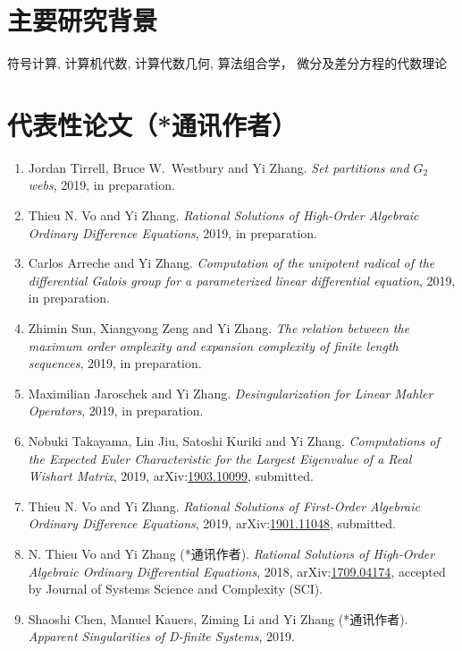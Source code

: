 \documentclass[a4paper,12pt]{article}
\begin{document}
\begin{CJK*}{UTF8}{gbsn}
\section*{\Large{主要研究背景}}
符号计算, 计算机代数, 计算代数几何, 算法组合学， 微分及差分方程的代数理论

\section*{\Large{代表性论文（*通讯作者）}}
\begin{enumerate}
\item Jordan Tirrell, Bruce W.\ Westbury and Yi Zhang. 
{\em Set partitions and $G_2$ webs}, 2019, in preparation.
\item Thieu N. Vo and Yi Zhang. 
{\em Rational Solutions of High-Order Algebraic Ordinary Difference Equations}, 2019, in preparation.
\item Carlos Arreche and Yi Zhang.
{\em Computation of the unipotent radical of the differential Galois group for a parameterized linear differential equation}, 2019, in preparation. 
\item Zhimin Sun,  Xiangyong Zeng and Yi Zhang. 
{\em The relation between the maximum order
omplexity and expansion complexity of finite length sequences}, 2019, in preparation.
\item Maximilian Jaroschek and Yi Zhang. 
{\em Desingularization for Linear Mahler Operators}, 2019, in preparation.
\item Nobuki Takayama, Lin Jiu, Satoshi Kuriki and Yi Zhang. 
 {\em Computations of the Expected Euler Characteristic for the Largest Eigenvalue of a Real Wishart Matrix}, 2019, 
 arXiv:\href{http://arxiv.org/abs/1903.10099}{1903.10099}, submitted.
  \item Thieu N. Vo and Yi Zhang. 
{\em Rational Solutions of First-Order Algebraic Ordinary Difference Equations}, 2019,  
arXiv:\href{http://arxiv.org/abs/1901.11048}{1901.11048}, submitted.
  \item N. Thieu Vo and Yi Zhang (*通讯作者). {\em Rational Solutions of High-Order Algebraic Ordinary Differential Equations}, 2018, 
  arXiv:\href{https://arxiv.org/abs/1709.04174}{1709.04174}, accepted by Journal of Systems Science and Complexity (SCI).
   \item Shaoshi Chen, Manuel Kauers, Ziming Li and Yi Zhang  (*通讯作者). {\em Apparent Singularities of D-finite Systems}, 2019. 

\end{enumerate}
\end{CJK*}
\end{document}
